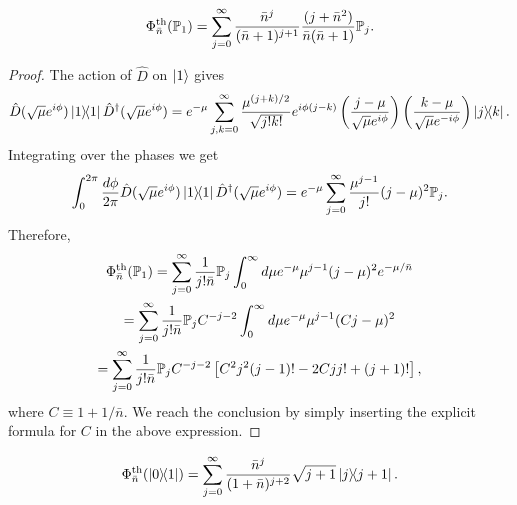 \documentclass[12pt]{report}
\newcommand{\PP}{\mathbb{P}}
\begin{document}
\begin{prop}\label{prop:thermalisation_applied_to_11}
	\begin{equation}
		\Phi^{\rm th}_{\bar n}(\PP_1)
		= \sum_{j=0}^\infty
			\frac{ \bar n^j }{ (\bar n+1)^{j+1} }
			\frac{ (j+ \bar n^2) }{ \bar n(\bar n + 1) }
			\PP_j.
	\end{equation}
	\label{prop:thermalisation_of_P1}
\end{prop}
\begin{proof}
	The action of $\hat D$ on $\ket1$ gives
	\begin{equation}
		\hat D(\sqrt\mu e^{i\phi})\ketbra1 \hat D^\dagger(\sqrt\mu e^{i\phi})
		= e^{-\mu} \sum_{j,k=0}^\infty \frac{\mu^{(j+k)/2}}{\sqrt{j!k!}} e^{i\phi(j-k)}
		\left(\frac{j-\mu}{\sqrt\mu e^{i\phi}}\right)
		\left(\frac{k-\mu}{\sqrt\mu e^{-i\phi}}\right)
		\ketbra{j}{k}.
	\end{equation}
	Integrating over the phases we get
	\begin{equation}
		\int_0^{2\pi} \frac{d\phi}{2\pi}
		\hat D(\sqrt\mu e^{i\phi})\ketbra1 \hat D^\dagger(\sqrt\mu e^{i\phi})
		= e^{-\mu} \sum_{j=0}^\infty \frac{\mu^{j-1}}{j!} (j-\mu)^2 \PP_j.
	\end{equation}
	Therefore,
	\begin{equation}
	\begin{gathered}
		\Phi_{\bar n}^{\rm th}(\PP_1)
		= \sum_{j=0}^\infty \frac{1}{j!\bar n}\PP_j \int_0^\infty d\mu
		e^{-\mu} \mu^{j-1} (j-\mu)^2 e^{-\mu/\bar n} \\
		= \sum_{j=0}^\infty \frac{1}{j!\bar n}\PP_j
		C^{-j-2} \int_0^\infty d\mu
		e^{-\mu} \mu^{j-1} (C j-\mu)^2 \\
		= \sum_{j=0}^\infty \frac{1}{j!\bar n}\PP_j
		C^{-j-2} \left[
			C^2 j^2 (j-1)! - 2C j j! + (j+1)!
		\right],
	\end{gathered}
	\end{equation}
	where $C\equiv 1+1/\bar n$.
	We reach the conclusion by simply inserting the explicit formula for $C$ in the above expression.
\end{proof}

\begin{prop}\label{prop:thermalisation_applied_to_01}
	\begin{equation}
		\Phi^{\rm th}_{\bar n}(\ketbra{0}{1})
		= \sum_{j=0}^\infty
		\frac{\bar n^{j}}{(1+\bar n)^{j+2}} \sqrt{j+1}
		\ketbra{j}{j+1}.
	\end{equation}
\end{prop}
\end{document}
